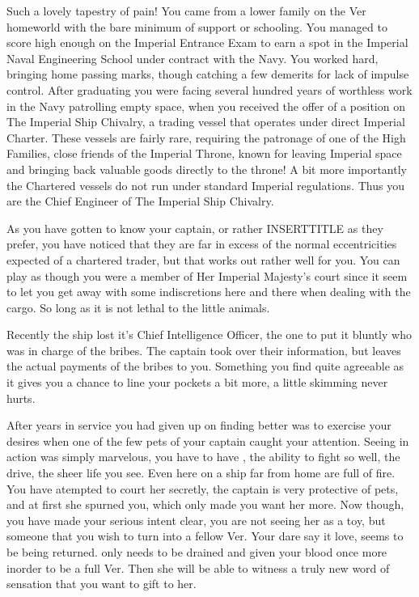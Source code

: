 \documentclass[char]{guildcamp4}
\begin{document}
\name{\cVtwo{}}


Such a lovely tapestry of pain! 
You came from a lower family on the Ver homeworld with the bare minimum of support or schooling. You managed to score high enough
on the Imperial Entrance Exam to earn a spot in the Imperial Naval Engineering School under contract with the Navy. You worked
hard, bringing home passing marks, though catching a few demerits for lack of impulse control. After graduating you were facing 
several hundred years of worthless work in the Navy patrolling empty space, when you received the offer of a position on 
The Imperial Ship Chivalry, a trading vessel that operates under direct Imperial Charter. These vessels are fairly rare, requiring
the patronage of one of the High Families, close friends of the Imperial Throne, known for leaving Imperial space and bringing
back valuable goods directly to the throne! A bit more importantly the Chartered vessels do not run under standard Imperial regulations.
Thus you are the Chief Engineer of The Imperial Ship Chivalry. 

As you have gotten to know your captain, or rather INSERTTITLE as they prefer, you have noticed that they are far in excess of the normal eccentricities expected of a chartered trader, but that works out rather well for you. You can play as though you were a member of Her Imperial Majesty's court since it seem to let you get away with some indiscretions here and there when dealing with the cargo. So long as it is not lethal to the little animals. 

Recently the ship lost it's Chief Intelligence Officer, the one to put it bluntly who was in charge of the bribes. The captain took over their information, but leaves the actual payments of the bribes to you. Something you find quite agreeable as it gives you a chance to line your pockets a bit more, a little skimming never hurts.

After years in \cVone{\their} service you had given up on finding better was to exercise your desires when one of the few pets of your captain caught your attention. Seeing  \cJulie{} in action was simply marvelous, you have to have \cJulie{\them}, the ability to fight so well, the drive, the sheer life you see. Even here on a ship far from home \cJulie{\they} are full of fire. You have atempted to court her secretly, the captain is very protective of  pets, and at first she spurned you, which only made you want her more. Now though, you have made your serious intent clear, you are not seeing her as a toy, but someone that you wish to turn into a fellow Ver. Your dare say it love, seems to be being returned. \cJulie{} only needs to be drained and given your blood once more inorder to be a full Ver. Then she will be able to witness a truly new word of sensation that you want to gift to her.
\end{document}
